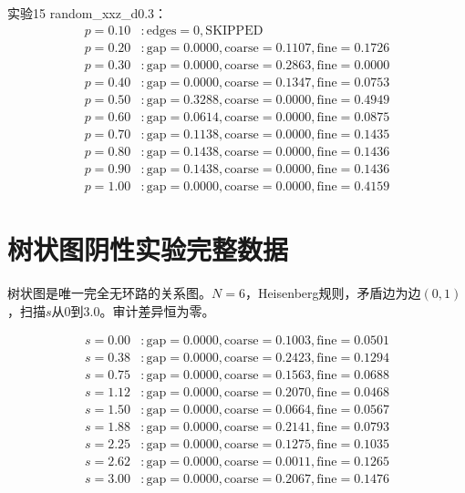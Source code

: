 \documentclass[11pt,a4paper]{book}
\theoremstyle{definition}
\begin{document}
实验15 random\_xxz\_d0.3：
\begin{align*}
p=0.10 &: \text{edges}=0, \text{SKIPPED} \\
p=0.20 &: \text{gap}=0.0000, \text{coarse}=0.1107, \text{fine}=0.1726 \\
p=0.30 &: \text{gap}=0.0000, \text{coarse}=0.2863, \text{fine}=0.0000 \\
p=0.40 &: \text{gap}=0.0000, \text{coarse}=0.1347, \text{fine}=0.0753 \\
p=0.50 &: \text{gap}=0.3288, \text{coarse}=0.0000, \text{fine}=0.4949 \\
p=0.60 &: \text{gap}=0.0614, \text{coarse}=0.0000, \text{fine}=0.0875 \\
p=0.70 &: \text{gap}=0.1138, \text{coarse}=0.0000, \text{fine}=0.1435 \\
p=0.80 &: \text{gap}=0.1438, \text{coarse}=0.0000, \text{fine}=0.1436 \\
p=0.90 &: \text{gap}=0.1438, \text{coarse}=0.0000, \text{fine}=0.1436 \\
p=1.00 &: \text{gap}=0.0000, \text{coarse}=0.0000, \text{fine}=0.4159
\end{align*}

\chapter{树状图阴性实验完整数据}

树状图是唯一完全无环路的关系图。$N=6$，Heisenberg规则，矛盾边为边$(0,1)$，扫描$s$从0到3.0。审计差异恒为零。

\begin{align*}
s=0.00 &: \text{gap}=0.0000, \text{coarse}=0.1003, \text{fine}=0.0501 \\
s=0.38 &: \text{gap}=0.0000, \text{coarse}=0.2423, \text{fine}=0.1294 \\
s=0.75 &: \text{gap}=0.0000, \text{coarse}=0.1563, \text{fine}=0.0688 \\
s=1.12 &: \text{gap}=0.0000, \text{coarse}=0.2070, \text{fine}=0.0468 \\
s=1.50 &: \text{gap}=0.0000, \text{coarse}=0.0664, \text{fine}=0.0567 \\
s=1.88 &: \text{gap}=0.0000, \text{coarse}=0.2141, \text{fine}=0.0793 \\
s=2.25 &: \text{gap}=0.0000, \text{coarse}=0.1275, \text{fine}=0.1035 \\
s=2.62 &: \text{gap}=0.0000, \text{coarse}=0.0011, \text{fine}=0.1265 \\
s=3.00 &: \text{gap}=0.0000, \text{coarse}=0.2067, \text{fine}=0.1476
\end{align*}
\end{document}
